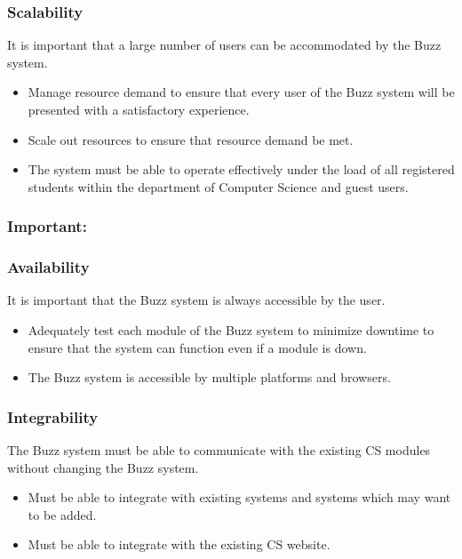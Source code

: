 \documentclass[12pt, oneside]{article}
\begin{document}
	\subsubsection*{Scalability}
	It is important that a large number of users can be accommodated by the Buzz system.
	\begin{itemize} 
		\item Manage resource demand to ensure that every user of the Buzz system will be presented with a satisfactory experience.
		\item Scale out resources to ensure that resource demand be met.
		\item The system must be able to operate effectively under the load of all registered students within the department of Computer Science and guest users.
	\end{itemize}
	
	
	\subsubsection{Important:}
	\subsubsection*{Availability}
	It is important that the Buzz system is always accessible by the user.
	\begin{itemize}
		\item Adequately test each module of the Buzz system to minimize downtime to ensure that the system can function even if a module is down.
		\item The Buzz system is accessible by multiple platforms and browsers.
	\end{itemize}
	
	\subsubsection*{Integrability}
	The Buzz system must be able to communicate with the existing CS modules without changing the Buzz system.
	\begin{itemize}
		\item Must be able to integrate with existing systems and systems which may want to be added.
		\item Must be able to integrate with the existing CS website.
	\end{itemize}
	
\end{document}
